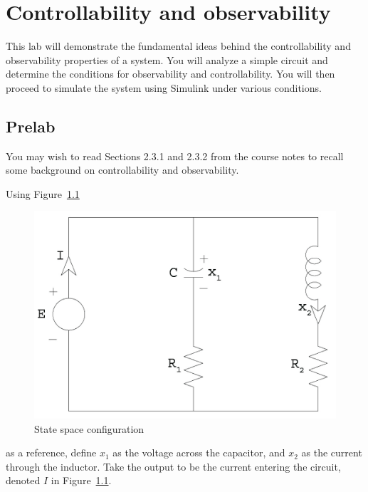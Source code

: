 \chapter{Controllability and observability}\label{chap:controlandobserve}

This lab will demonstrate the fundamental ideas behind the controllability
and observability properties of a system.  You will analyze a simple circuit
and determine the conditions for observability and controllability.  You will
then proceed to simulate the system using \textsf{Simulink} under various
conditions.

\section{Prelab}

You may wish to read Sections 2.3.1 and 2.3.2 from the
course notes to recall some background on controllability and observability.

Using Figure~\ref{fig:circuit}
\begin{figure}[htbp]
\centering
\includegraphics[width=0.6\hsize]{pix/circuitlarge.jpg}
\caption{State space configuration}\label{fig:circuit}
\end{figure}
as a reference, define $x_{1}$ as the voltage across the capacitor, and
$x_{2}$ as the current through the inductor.  Take the output to be the
current entering the circuit, denoted $I$ in Figure~\ref{fig:circuit}.

